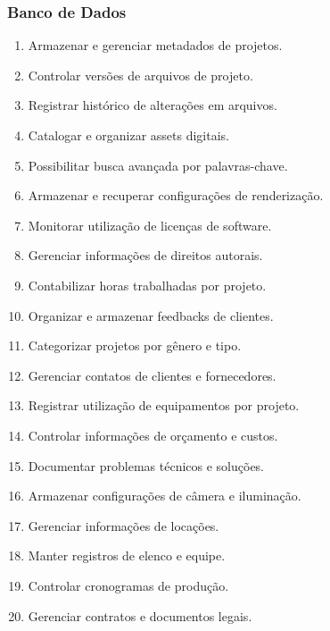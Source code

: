 \subsubsection{Banco de Dados}
\begin{enumerate}
  \item Armazenar e gerenciar metadados de projetos.
  \item Controlar versões de arquivos de projeto.
  \item Registrar histórico de alterações em arquivos.
  \item Catalogar e organizar assets digitais.
  \item Possibilitar busca avançada por palavras-chave.
  \item Armazenar e recuperar configurações de renderização.
  \item Monitorar utilização de licenças de software.
  \item Gerenciar informações de direitos autorais.
  \item Contabilizar horas trabalhadas por projeto.
  \item Organizar e armazenar feedbacks de clientes.
  \item Categorizar projetos por gênero e tipo.
  \item Gerenciar contatos de clientes e fornecedores.
  \item Registrar utilização de equipamentos por projeto.
  \item Controlar informações de orçamento e custos.
  \item Documentar problemas técnicos e soluções.
  \item Armazenar configurações de câmera e iluminação.
  \item Gerenciar informações de locações.
  \item Manter registros de elenco e equipe.
  \item Controlar cronogramas de produção.
  \item Gerenciar contratos e documentos legais.
\end{enumerate}

